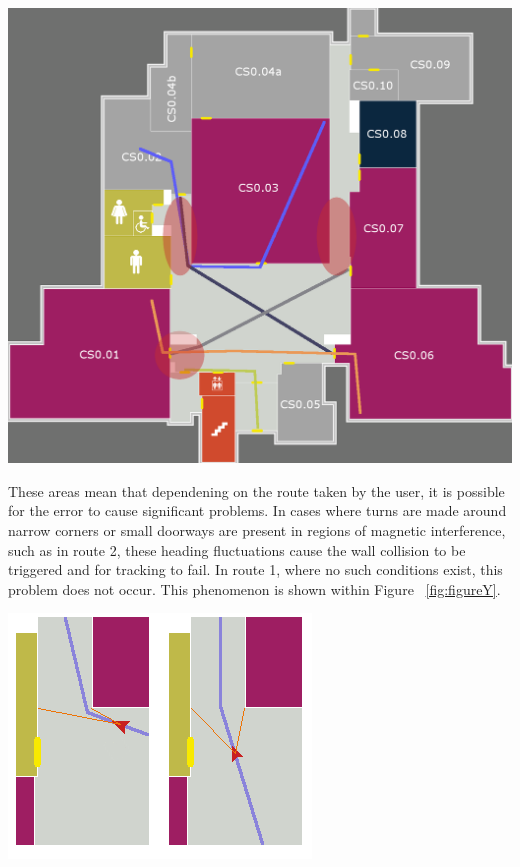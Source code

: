 \documentclass[12pt,a4paper]{report}
\begin{document}
\begin{center}
\includegraphics[scale=0.3]{images/figureX.png}
\label{fig:figureX}
\end{center}

These areas mean that dependening on the route taken by the user, it is possible for the error to cause significant problems. In cases where turns are made around narrow corners or small doorways are present in regions of magnetic interference, such as in route 2, these heading fluctuations cause the wall collision to be triggered and for tracking to fail. In route 1, where no such conditions exist, this problem does not occur. This phenomenon is shown within Figure ~\ref{fig:figureY}.

\begin{center}
\includegraphics[scale=0.8]{images/figureY.png}
\label{fig:figureY}
\end{center}
\end{document}
